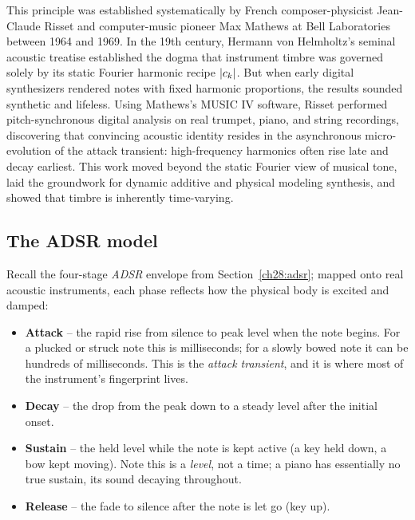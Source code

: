 \begin{historybox}
This principle was established systematically by French composer-physicist Jean-Claude Risset
and computer-music pioneer Max Mathews at Bell Laboratories between 1964 and 1969. In the 19th
century, Hermann von Helmholtz's seminal acoustic treatise established the dogma that instrument
timbre was governed solely by its static Fourier harmonic recipe $\lvert c_k\rvert$. But when early digital
synthesizers rendered notes with fixed harmonic proportions, the results sounded synthetic and
lifeless. Using Mathews's MUSIC IV software, Risset performed pitch-synchronous digital analysis
on real trumpet, piano, and string recordings, discovering that convincing acoustic identity
resides in the asynchronous micro-evolution of the attack transient: high-frequency harmonics
often rise late and decay earliest. This work moved beyond the static Fourier view of musical
tone, laid the groundwork for dynamic additive and physical modeling synthesis, and showed that
timbre is inherently time-varying.
\end{historybox}

\subsection*{The ADSR model}

Recall the four-stage \emph{ADSR} envelope from Section~\ref{ch28:adsr}; mapped onto real acoustic instruments, each phase reflects how the physical body is excited and damped:

\begin{itemize}
  \item \textbf{Attack} -- the rapid rise from silence to peak level when the note begins. For a
    plucked or struck note this is milliseconds; for a slowly bowed note it can be hundreds of
    milliseconds. This is the \emph{attack transient}, and it is where most of the instrument's
    fingerprint lives.
  \item \textbf{Decay} -- the drop from the peak down to a steady level after the initial onset.
  \item \textbf{Sustain} -- the held level while the note is kept active (a key held down, a bow kept
    moving). Note this is a \emph{level}, not a time; a piano has essentially no true sustain, its
    sound decaying throughout.
  \item \textbf{Release} -- the fade to silence after the note is let go (key up).
\end{itemize}

